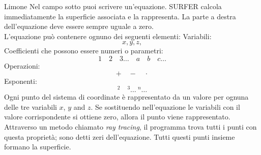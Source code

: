 \begin{surferPage}{Limone}
Nel campo sotto puoi scrivere un'equazione. SURFER calcola immediatamente la superficie associata e la rappresenta. La parte a destra dell'equazione deve essere sempre  uguale a zero.\\
L'equazione pu\`o contenere ognuno dei seguenti elementi:
\newline
Variabili:
\[x, y, z, \]
Coefficienti che possono essere numeri o parametri:
\[1\quad 2\quad 3\dots\quad a\quad b\quad c\dots\]
Operazioni:
\[+\quad  - \quad \cdot \]
Esponenti:
\[ ^2\quad ^3\ldots\ ^n\ldots\]
Ogni punto del sistema di coordinate \`e rappresentato da un valore per ognuna delle tre variabili  $x$, $y$ and $z$. 
Se sostituendo nell'equazione le variabili con il valore corrispondente  si ottiene zero, allora il punto viene rappresentato.
Attraverso un metodo chiamato  \textit{ray tracing}, il programma trova tutti i punti con questa propriet\`a; sono detti zeri dell'equazione.
Tutti questi punti insieme formano la superficie.
\end{surferPage}
